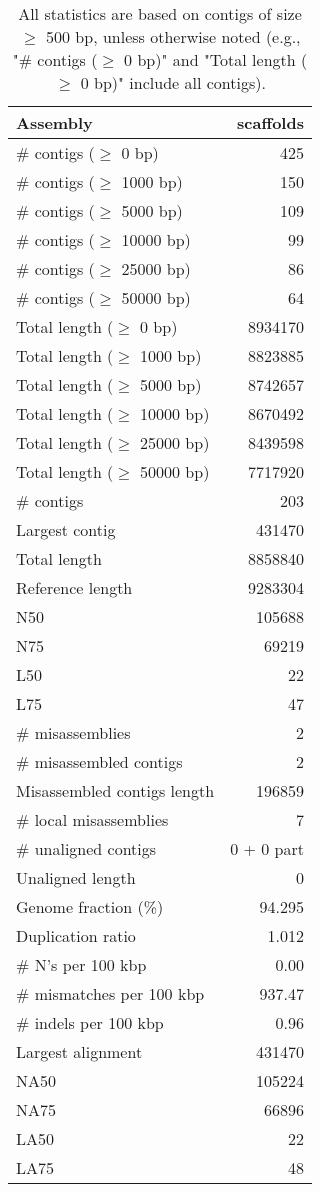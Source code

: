 \documentclass[12pt,a4paper]{article}
\begin{document}
\begin{table}[ht]
\begin{center}
\caption{All statistics are based on contigs of size $\geq$ 500 bp, unless otherwise noted (e.g., "\# contigs ($\geq$ 0 bp)" and "Total length ($\geq$ 0 bp)" include all contigs).}
\begin{tabular}{|l*{1}{|r}|}
\hline
Assembly & scaffolds \\ \hline
\# contigs ($\geq$ 0 bp) & 425 \\ \hline
\# contigs ($\geq$ 1000 bp) & 150 \\ \hline
\# contigs ($\geq$ 5000 bp) & 109 \\ \hline
\# contigs ($\geq$ 10000 bp) & 99 \\ \hline
\# contigs ($\geq$ 25000 bp) & 86 \\ \hline
\# contigs ($\geq$ 50000 bp) & 64 \\ \hline
Total length ($\geq$ 0 bp) & 8934170 \\ \hline
Total length ($\geq$ 1000 bp) & 8823885 \\ \hline
Total length ($\geq$ 5000 bp) & 8742657 \\ \hline
Total length ($\geq$ 10000 bp) & 8670492 \\ \hline
Total length ($\geq$ 25000 bp) & 8439598 \\ \hline
Total length ($\geq$ 50000 bp) & 7717920 \\ \hline
\# contigs & 203 \\ \hline
Largest contig & 431470 \\ \hline
Total length & 8858840 \\ \hline
Reference length & 9283304 \\ \hline
N50 & 105688 \\ \hline
N75 & 69219 \\ \hline
L50 & 22 \\ \hline
L75 & 47 \\ \hline
\# misassemblies & 2 \\ \hline
\# misassembled contigs & 2 \\ \hline
Misassembled contigs length & 196859 \\ \hline
\# local misassemblies & 7 \\ \hline
\# unaligned contigs & 0 + 0 part \\ \hline
Unaligned length & 0 \\ \hline
Genome fraction (\%) & 94.295 \\ \hline
Duplication ratio & 1.012 \\ \hline
\# N's per 100 kbp & 0.00 \\ \hline
\# mismatches per 100 kbp & 937.47 \\ \hline
\# indels per 100 kbp & 0.96 \\ \hline
Largest alignment & 431470 \\ \hline
NA50 & 105224 \\ \hline
NA75 & 66896 \\ \hline
LA50 & 22 \\ \hline
LA75 & 48 \\ \hline
\end{tabular}
\end{center}
\end{table}
\end{document}
